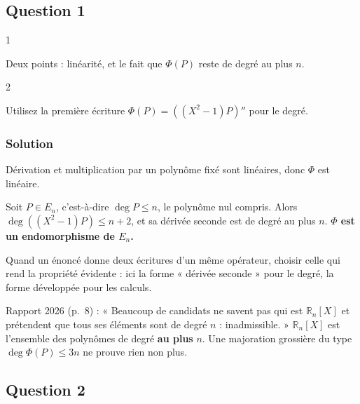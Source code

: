 \documentclass[11pt,a4paper]{article}
\begin{document}
\hypertarget{question-1-1}{%
\subsection{Question 1}\label{question-1-1}}

\begin{indication}{1}

Deux points : linéarité, et le fait que \(\Phi(P)\) reste de degré au plus \(n\).

\end{indication}

\begin{indication}{2}

Utilisez la première écriture \(\Phi(P)=((X^2-1)P)''\) pour le degré.

\end{indication}

\hypertarget{solution-20}{%
\subsubsection{Solution}\label{solution-20}}

Dérivation et multiplication par un polynôme fixé sont linéaires, donc \(\Phi\) est linéaire.

Soit \(P\in E_n\), c'est-à-dire \(\deg P\le n\), le polynôme nul compris. Alors \(\deg((X^2-1)P)\le n+2\), et sa dérivée seconde est de degré au plus \(n\). \textbf{\(\Phi\) est un endomorphisme de \(E_n\).}

\begin{methode}

Quand un énoncé donne deux écritures d'un même opérateur, choisir celle qui rend la propriété évidente : ici la forme « dérivée seconde » pour le degré, la forme développée pour les calculs.

\end{methode}

\begin{piege}

Rapport 2026 (p.~8) : « Beaucoup de candidats ne savent pas qui est \(\mathbb R_n[X]\) et prétendent que tous ses éléments sont de degré \(n\) : inadmissible. » \(\mathbb R_n[X]\) est l'ensemble des polynômes de degré \textbf{au plus} \(n\). Une majoration grossière du type \(\deg\Phi(P)\le3n\) ne prouve rien non plus.

\end{piege}

\hypertarget{question-2-1}{%
\subsection{Question 2}\label{question-2-1}}
\end{document}
